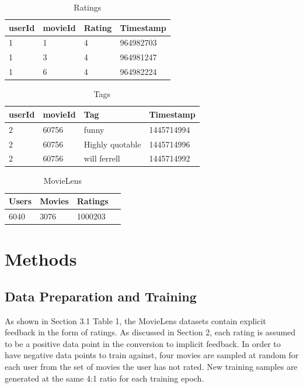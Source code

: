 \documentclass{article}
\begin{document}
\begin{table}[h]
\caption{Ratings}
\centering
\begin{tabular}{llll}
\toprule
userId & movieId & Rating & Timestamp \\
\midrule
1 & 1 & 4 & 964982703 \\
1 & 3 & 4 & 964981247 \\
1 & 6 & 4 & 964982224 \\
\bottomrule
\end{tabular}
\label{tab:table1}
\end{table}

\begin{table} [h]
\caption{Tags}
\centering
\begin{tabular}{llll}
\toprule
userId & movieId & Tag & Timestamp \\
\midrule
2 & 60756 & funny & 1445714994 \\
2 & 60756 & Highly quotable & 1445714996 \\
2 & 60756 & will ferrell & 1445714992 \\
\bottomrule
\end{tabular}
\label{tab:table2}
\end{table}

\begin{table}[h]
\caption{MovieLens}
\centering
\begin{tabular}{llll}
\toprule
Users & Movies & Ratings \\
\midrule
6040 & 3076 & 1000203 \\
\bottomrule
\end{tabular}
\end{table}

\section{Methods}
\subsection{Data Preparation and Training}
As shown in Section 3.1 Table 1, the MovieLens datasets contain explicit feedback in the form of ratings. As discussed in Section 2, each rating is assumed to be a positive data point in the conversion to implicit feedback. In order to have negative data points to train against, four movies are sampled at random for each user from the set of movies the user has not rated. New training samples are generated at the same 4:1 ratio for each training epoch.
\end{document}
